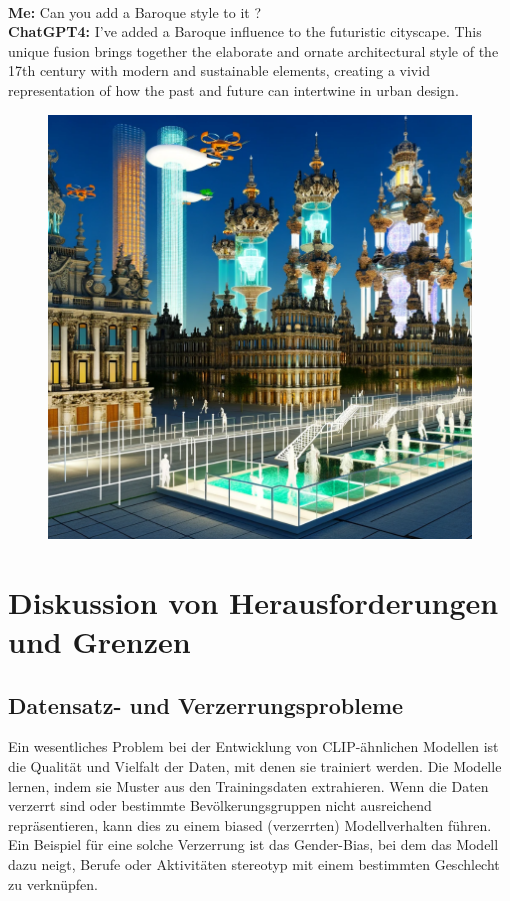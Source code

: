 \documentclass[nolibertine, ngerman, algorithm, nomencl, minted]{ttlab-qualify}
\begin{document}
\\
\textbf{Me:} Can you add a Baroque style to it ?\\
\textbf{ChatGPT4:} I've added a Baroque influence to the futuristic cityscape. This unique fusion brings together 
the elaborate and ornate architectural style of the 17th century with modern and sustainable elements, creating a 
vivid representation of how the past and future can intertwine in urban design.
\begin{figure}[h!]
	\centering
	\includegraphics[scale=0.2]{static/fcity_barock.png}
\end{figure}



\section{Diskussion von Herausforderungen und Grenzen}
\subsection{Datensatz- und Verzerrungsprobleme}
Ein wesentliches Problem bei der Entwicklung von CLIP-ähnlichen Modellen ist die Qualität und Vielfalt der Daten, 
mit denen sie trainiert werden. Die Modelle lernen, indem sie Muster aus den Trainingsdaten extrahieren. Wenn die 
Daten verzerrt sind oder bestimmte Bevölkerungsgruppen nicht ausreichend repräsentieren, kann dies zu einem biased (verzerrten) 
Modellverhalten führen. Ein Beispiel für eine solche Verzerrung ist das Gender-Bias, bei dem das Modell dazu neigt, Berufe oder 
Aktivitäten stereotyp mit einem bestimmten Geschlecht zu verknüpfen.
\end{document}
